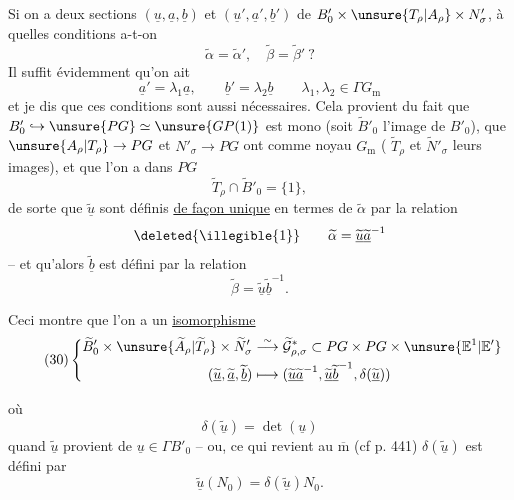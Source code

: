 Si on a deux sections $(\underline u,\underline a,\underline b)$ et
$(\underline u',\underline a',\underline b')$ de
$B'_0\times\unsure{T_\rho|A_\rho}\times N'_\sigma$, à quelles
conditions a-t-on
\[
\tag{27}
\widetilde\alpha=\widetilde\alpha',\quad
\widetilde\beta=\widetilde\beta'\ ?
\]
Il suffit évidemment qu'on ait
\[
\tag{28}
\underline a'=\lambda_1\underline a,\qquad
\underline b'=\lambda_2\underline b
\qquad \lambda_1,\lambda_2\in\Gamma G_{\mathrm m}
\]
et je dis que ces conditions sont aussi nécessaires.
Cela provient du fait que
$B'_0\hookrightarrow\unsure{PG}\simeq\unsure{GP(1)}$
est mono (soit $\widetilde B'_0$ l'image de $B'_0$),
que  $\unsure{A_\rho|T_\rho}\to PG$ et
$N'_\sigma\longrightarrow PG$ ont comme noyau $G_{\mathrm m}$
( $\widetilde T_\rho$ et $\widetilde N'_\sigma$ leurs images),
et que l'on a dans $PG$
\[
\tag{29}
\widetilde T_\rho\cap\widetilde B'_0=\{1\},
\]
de sorte que  $\widetilde{\underline u}$
sont définis \uline{de façon unique} en termes de $\widetilde\alpha$
par la relation
\[
\deleted{\illegible{1}}\qquad
\widetilde\alpha=\widetilde{\underline u}\widetilde{\underline a}^{-1}
\]
-- et qu'alors $\widetilde{\underline b}$ est défini
par la relation
\[
\widetilde\beta=\widetilde{\underline u}\widetilde{\underline b}^{-1}.
\]

Ceci montre que  l'on a un \uline{isomorphisme}
\[
\tag{30}
\left\{\begin{aligned}
\widetilde B'_0\times\unsure{\widetilde A_\rho|\widetilde T_\rho}\times\widetilde N'_\sigma
&\overset{\sim}{\longrightarrow}
\widetilde{\mathcal G}^{*}_{\rho,\sigma}
\subset PG\times PG\times\unsure{\mathbb E^1|\mathbb E'}\\
(\widetilde{\underline u},\widetilde{\underline a},\widetilde{\underline b})
&\longmapsto
(\widetilde{\underline u}\widetilde{\underline a}^{-1},
\widetilde{\underline u}\widetilde{\underline b}^{-1},
\delta(\widetilde{\underline u}))
\end{aligned}\right.
\]


où
\[
\tag{31}
\delta(\widetilde{\underline u})=\det(\underline u)
\]
quand $\widetilde{\underline u}$ provient de $\underline u\in\Gamma B'_0$ --
ou, ce qui revient au $\overline{\mathrm m}$ (cf p. 441)
$\delta(\widetilde{\underline u})$ est défini par
\[
\tag{32}
\widetilde{\underline u}(N_0)=\delta(\widetilde{\underline u})N_0.
\]

